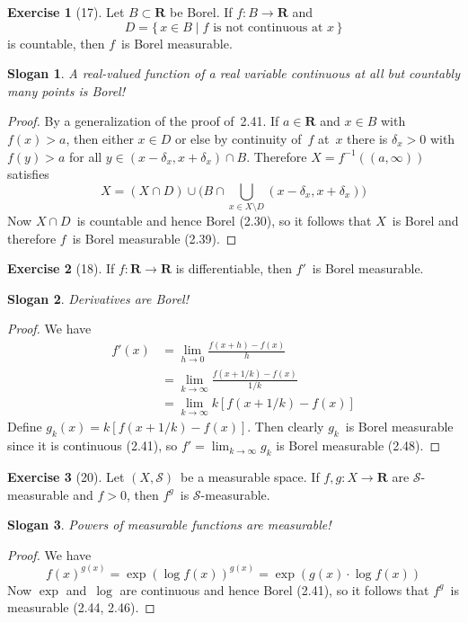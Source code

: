 \documentclass[letterpaper,12pt]{article}
\newcommand{\R}{\mathbf{R}}
\renewcommand{\S}{\mathcal{S}}
\newcommand{\union}{\cup}
\newcommand{\bigunion}{\bigcup}
\newcommand{\sect}{\cap}
\newcommand{\mult}{\cdot}
\newcommand{\inv}[1]{#1^{-1}}
\theoremstyle{definition}
\newtheorem*{exer}{Exercise}
\theoremstyle{remark}
\theoremstyle{plain}
\newtheorem*{slogan}{Slogan}
\begin{document}
\begin{exer}[17]
Let \(B\subset\R\) be Borel. If \(f:B\to\R\) and
\[D=\{\,x\in B\mid f\text{ is not continuous at }x\,\}\]
is countable, then \(f\)~is Borel measurable.
\end{exer}
\begin{slogan}
A real-valued function of a real variable continuous at all but countably many points is Borel!
\end{slogan}
\begin{proof}
By a generalization of the proof of~2.41. If \(a\in\R\) and \(x\in B\) with \(f(x)>a\), then either \(x\in D\) or else by continuity of~\(f\) at~\(x\) there is \(\delta_x>0\) with \(f(y)>a\) for all \(y\in(x-\delta_x,x+\delta_x)\sect B\). Therefore \(X=\inv{f}((a,\infty))\) satisfies
\[X=(X\sect D)\union\bigl(B\sect\!\!\!\bigunion_{x\in X\setminus D}\!\!\!(x-\delta_x,x+\delta_x)\bigr)\]
Now \(X\sect D\)~is countable and hence Borel (2.30), so it follows that \(X\)~is Borel and therefore \(f\)~is Borel measurable (2.39).
\end{proof}

\begin{exer}[18]
If \(f:\R\to\R\) is differentiable, then \(f'\)~is Borel measurable.
\end{exer}
\begin{slogan}
Derivatives are Borel!
\end{slogan}
\begin{proof}
We have
\begin{align*}
f'(x)&=\lim_{h\to 0}\frac{f(x+h)-f(x)}{h}\\
	&=\lim_{k\to\infty}\frac{f(x+1/k)-f(x)}{1/k}\\
	&=\lim_{k\to\infty}k[f(x+1/k)-f(x)]
\end{align*}
Define \(g_k(x)=k[f(x+1/k)-f(x)]\). Then clearly \(g_k\)~is Borel measurable since it is continuous (2.41), so \(f'=\lim_{k\to\infty}g_k\) is Borel measurable (2.48).
\end{proof}

\begin{exer}[20]
Let \((X,\S)\)~be a measurable space. If \(f,g:X\to\R\) are \(\S\)-measurable and \(f>0\), then \(f^g\)~is \(\S\)-measurable.
\end{exer}
\begin{slogan}
Powers of measurable functions are measurable!
\end{slogan}
\begin{proof}
We have
\[f(x)^{g(x)}=\exp(\log f(x))^{g(x)}=\exp(g(x)\mult\log f(x))\]
Now \(\exp\) and~\(\log\) are continuous and hence Borel (2.41), so it follows that \(f^g\)~is measurable (2.44, 2.46).
\end{proof}
\end{document}
